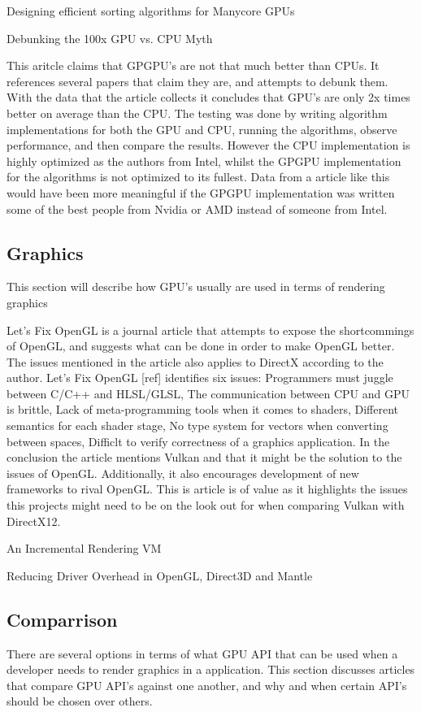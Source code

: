 Designing efficient sorting algorithms for Manycore GPUs \cite{satish_2009_designing}

Debunking the 100x GPU vs. CPU Myth \cite{lee_2010_debunking}

This aritcle claims that GPGPU's are not that much better than CPUs. 
It references several papers that claim they are, and attempts to debunk them. 
With the data that the article collects it concludes that GPU's are only 2x times better on average than the CPU. 
The testing was done by writing algorithm implementations for both the GPU and CPU, running the algorithms, observe performance, and then compare the results. 
However the CPU implementation is highly optimized as the authors  from Intel, whilst the GPGPU implementation for the algorithms is not optimized to its fullest. 
Data from a article like this would have been more meaningful if the GPGPU implementation was written some of the best people from Nvidia or AMD instead of someone from Intel.

\subsection{Graphics}
This section will describe how GPU's usually are used in terms of rendering graphics


Let's Fix OpenGL \cite{fix_opengl} is a journal article that attempts to expose the shortcommings of OpenGL, and suggests what can be done in order to make OpenGL better. 
The issues mentioned in the article also applies to DirectX according to the author. 
Let's Fix OpenGL [ref] identifies six issues: 
Programmers must juggle between C/C++ and HLSL/GLSL, 
The communication between CPU and GPU is brittle,
Lack of meta-programming tools when it comes to shaders,
Different semantics for each shader stage,
No type system for vectors when converting between spaces,
Difficlt to verify correctness of a graphics application.
In the conclusion the article mentions Vulkan and that it might be the solution to the issues of OpenGL. Additionally, it also encourages development of new frameworks to rival OpenGL.
This is article is of value as it highlights the issues this projects might need to be on the look out for when comparing Vulkan with DirectX12.

An Incremental Rendering VM \cite{haaser_2015_incremental}

Reducing Driver Overhead in OpenGL, Direct3D and Mantle  \cite{dobersberger_2015_reducing}

\subsection{Comparrison}
There are several options in terms of what GPU API that can be used when a developer needs to render graphics in a application. This section discusses articles that compare GPU API's against one another, and why and when certain API's should be chosen over others.

